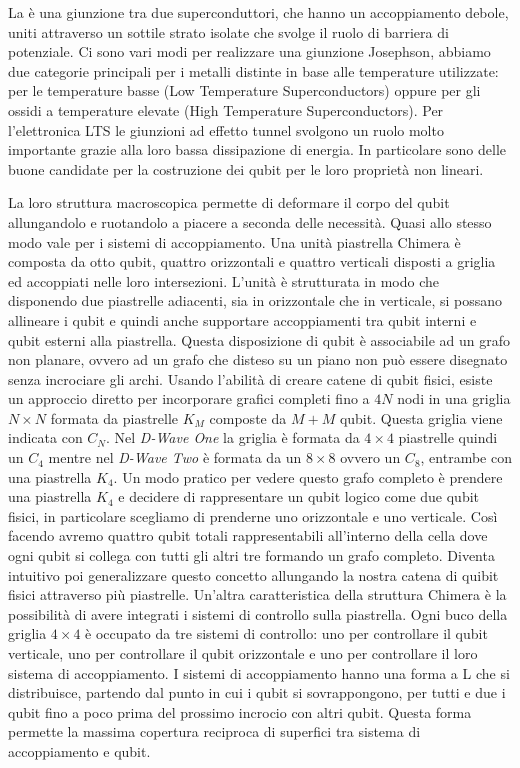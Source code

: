 La \cite{JJQ} è una giunzione tra due superconduttori, che hanno un accoppiamento debole, uniti attraverso un sottile strato isolate che svolge il ruolo di barriera di potenziale. Ci sono vari modi per realizzare una giunzione Josephson, abbiamo due categorie principali per i metalli distinte in base alle temperature utilizzate: per le temperature basse  (Low Temperature Superconductors) oppure per gli ossidi a temperature elevate  (High Temperature Superconductors). Per l'elettronica LTS le giunzioni ad effetto tunnel svolgono un ruolo molto importante grazie alla loro bassa dissipazione di energia. In particolare sono delle buone candidate per la costruzione dei qubit per le loro proprietà non lineari.

La loro struttura macroscopica permette di deformare il corpo del qubit allungandolo e ruotandolo a piacere a seconda delle necessità. Quasi allo stesso modo vale per i sistemi di accoppiamento. Una unità piastrella Chimera è composta da otto qubit, quattro orizzontali e quattro verticali disposti a griglia ed accoppiati nelle loro intersezioni. L'unità è strutturata in modo che disponendo due piastrelle adiacenti, sia in orizzontale che in verticale, si possano allineare i qubit e quindi anche supportare accoppiamenti tra qubit interni e qubit esterni alla piastrella. Questa disposizione di qubit è associabile ad un grafo non planare, ovvero ad un grafo che disteso su un piano non può essere disegnato senza incrociare gli archi.
Usando l'abilità di creare catene di qubit fisici, esiste un approccio diretto per incorporare grafici completi fino a $4N$ nodi in una griglia $N \times N$ formata da piastrelle $K_M$ composte da $M + M$ qubit. Questa griglia viene indicata con $C_N$. Nel \textit{D-Wave One} la griglia è formata da $4\times4$ piastrelle quindi un $C_4$ mentre nel \textit{D-Wave Two} è formata da un $8\times8$ ovvero un $C_8$, entrambe con una piastrella $K_4$. Un modo pratico per vedere questo grafo completo è prendere una piastrella $K_4$ e decidere di rappresentare un qubit logico come due qubit fisici, in particolare scegliamo di prenderne uno orizzontale e uno verticale. Così facendo avremo quattro qubit totali rappresentabili all'interno della cella dove ogni qubit si collega con tutti gli altri tre formando un grafo completo. Diventa intuitivo poi generalizzare questo concetto allungando la nostra catena di quibit fisici attraverso più piastrelle. Un'altra caratteristica della struttura Chimera è la possibilità di avere integrati i sistemi di controllo sulla piastrella. Ogni buco della griglia $4\times4$ è occupato da tre sistemi di controllo: uno per controllare il qubit verticale, uno per controllare il qubit orizzontale e uno per controllare il loro sistema di accoppiamento. I sistemi di accoppiamento hanno una forma a L che si distribuisce, partendo dal punto in cui i qubit si sovrappongono, per tutti e due i qubit fino a poco prima del prossimo incrocio con altri qubit. Questa forma permette la massima copertura reciproca di superfici tra sistema di accoppiamento e qubit.
